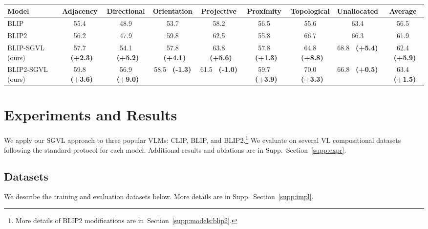 \documentclass[11pt]{article}
\def\Secref#1{Section~\ref{#1}}
\newcommand{\tablestyle}[2]{\setlength{\tabcolsep}{#1}\renewcommand{\arraystretch}{#2}\centering\footnotesize}
\newcommand{\smodel}{SGVL}
\newcommand{\gcol}[1]{{\bf \fontsize{6.5}{42}\selectfont \color{citecolor!80}~(#1)}}
\newcommand{\rcol}[1]{{\bf \fontsize{6.5}{42}\selectfont \color{lightred!180}~(#1)}}
\def\Secref#1{Section~\ref{#1}}
\begin{document}
\begin{table*}[t!]
\label{tab:res_winoground_vlc}
\end{table*} \begin{table*}[t!]
\centering
	\tablestyle{2.7pt}{1.}
	\scriptsize
    \begin{small}
    \begin{tabular}{l|cccccccc}
            \toprule
            Model & Adjacency & Directional & Orientation & Projective & Proximity & Topological & Unallocated & Average\\
            \midrule
            BLIP  & 55.4 & 48.9 & 53.7 & 58.2 & 56.5 & 55.6 & 63.4 & 56.5\\
            BLIP2  &56.2  &47.9  &59.8  &62.5  &55.8  &66.7  &66.3  &61.9  \\
            \midrule
            BLIP-SGVL (ours) & 57.7 \gcol{+2.3} & 54.1 \gcol{+5.2} & 57.8 \gcol{+4.1} & 63.8 \gcol{+5.6}& 57.8 \gcol{+1.3}& 64.8 \gcol{+8.8} & 68.8 \gcol{+5.4} & 62.4 \gcol{+5.9}\\

            BLIP2-SGVL (ours) & 59.8 \gcol{+3.6}  & 56.9 \gcol{+9.0} & 58.5 \rcol{-1.3} & 61.5 \rcol{-1.0} & 59.7 \gcol{+3.9} &  70.0 \gcol{+3.3} & 66.8 \gcol{+0.5} & 63.4 \gcol{+1.5}\\
            \bottomrule
    \end{tabular}
    \end{small}
    \vspace{-1.0em}
    \caption{
    \textbf{VSR Results.} Results for SGVL and baselines on the VSR dataset.}
    \vspace{-1.5em}
\label{tab:res_vsr}
\end{table*} \section{Experiments and Results}
\label{sec:expr}



We apply our {\smodel} approach to three popular VLMs: CLIP, BLIP, and BLIP2.\footnote{More details of BLIP2 modifications are in~\Secref{supp:models:blip2}.} We evaluate on several VL compositional datasets following the standard protocol for each model. Additional results and ablations are in Supp.~\Secref{supp:expr}.










\subsection{Datasets}
\label{sec:expr:datasets}
We describe the training and evaluation datasets below. More details are in Supp.~\Secref{supp:impl}.
\end{document}

